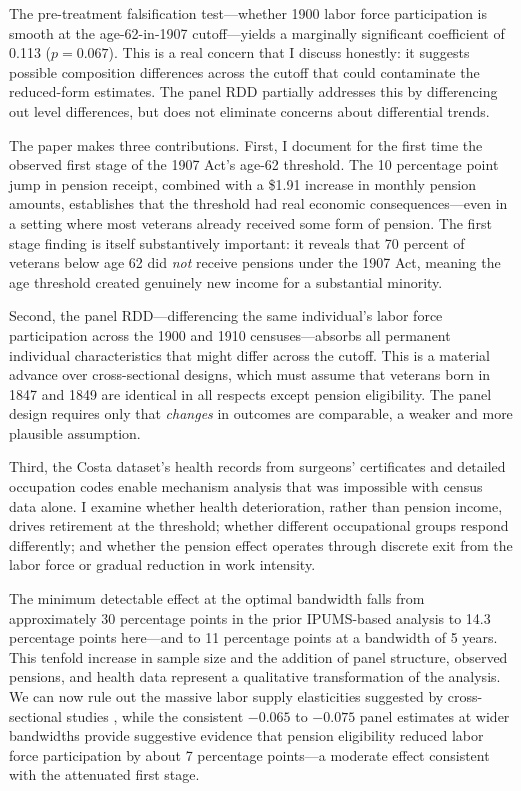 \documentclass[12pt]{article}
\begin{document}
The pre-treatment falsification test---whether 1900 labor force participation is smooth at the age-62-in-1907 cutoff---yields a marginally significant coefficient of 0.113 ($p = 0.067$). This is a real concern that I discuss honestly: it suggests possible composition differences across the cutoff that could contaminate the reduced-form estimates. The panel RDD partially addresses this by differencing out level differences, but does not eliminate concerns about differential trends.

The paper makes three contributions. First, I document for the first time the observed first stage of the 1907 Act's age-62 threshold. The 10 percentage point jump in pension receipt, combined with a \$1.91 increase in monthly pension amounts, establishes that the threshold had real economic consequences---even in a setting where most veterans already received some form of pension. The first stage finding is itself substantively important: it reveals that 70 percent of veterans below age 62 did \textit{not} receive pensions under the 1907 Act, meaning the age threshold created genuinely new income for a substantial minority.

Second, the panel RDD---differencing the same individual's labor force participation across the 1900 and 1910 censuses---absorbs all permanent individual characteristics that might differ across the cutoff. This is a material advance over cross-sectional designs, which must assume that veterans born in 1847 and 1849 are identical in all respects except pension eligibility. The panel design requires only that \textit{changes} in outcomes are comparable, a weaker and more plausible assumption.

Third, the Costa dataset's health records from surgeons' certificates and detailed occupation codes enable mechanism analysis that was impossible with census data alone. I examine whether health deterioration, rather than pension income, drives retirement at the threshold; whether different occupational groups respond differently; and whether the pension effect operates through discrete exit from the labor force or gradual reduction in work intensity.

The minimum detectable effect at the optimal bandwidth falls from approximately 30 percentage points in the prior IPUMS-based analysis to 14.3 percentage points here---and to 11 percentage points at a bandwidth of 5 years. This tenfold increase in sample size and the addition of panel structure, observed pensions, and health data represent a qualitative transformation of the analysis. We can now rule out the massive labor supply elasticities suggested by cross-sectional studies \citep{costa1995pensions}, while the consistent $-0.065$ to $-0.075$ panel estimates at wider bandwidths provide suggestive evidence that pension eligibility reduced labor force participation by about 7 percentage points---a moderate effect consistent with the attenuated first stage.
\end{document}
